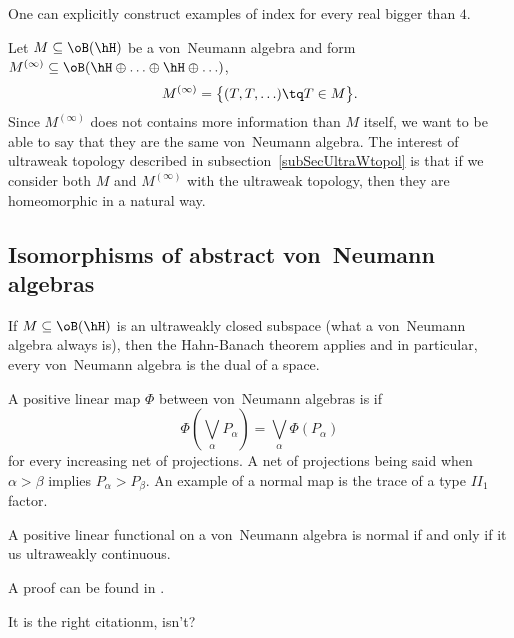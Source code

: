 One can explicitly construct examples of index for every real bigger than $4$.

Let $M\subseteq\oB(\hH)$ be a von~Neumann algebra and form $M^{(\infty)}\subseteq\oB(\hH\oplus\ldots\oplus\hH\oplus\ldots)$,
\begin{equation}
	M^{(\infty)}=\big\{  (T,T,\ldots)\tq T\in M  \big\}.
\end{equation}
Since $M^{(\infty)}$ does not contains more information than $M$ itself, we want to be able to say that they are the same von~Neumann algebra. The interest of ultraweak topology described in subsection~\ref{subSecUltraWtopol} is that if we consider both $M$ and $M^{(\infty)}$ with the ultraweak topology, then they are homeomorphic in a natural way.


					\subsection{Isomorphisms of abstract von~Neumann algebras}

If $M\subseteq\oB(\hH)$ is an ultraweakly closed subspace (what a von~Neumann algebra always is), then the Hahn-Banach theorem applies and in particular, every von~Neumann algebra is the dual of a space.

A positive linear map $\Phi$ between von~Neumann algebras is  if
\begin{equation}
	\Phi(\bigvee_{\alpha}P_{\alpha})=\bigvee_{\alpha}\Phi(P_{\alpha})
\end{equation}
for every increasing net of projections. A net of projections being said  when $\alpha>\beta$ implies $P_{\alpha}>P_{\beta}$. An example of a normal map is the trace of a type $II_1$ factor.

\begin{theorem}		\label{ThoDixLinVNanormifffuwc}
A positive linear functional on a von~Neumann algebra is normal if and only if it us ultraweakly continuous.
\end{theorem}
A proof can be found in \cite{DixDecompBk}.

\begin{probleme}
It is the right citationm, isn't?
\end{probleme}

